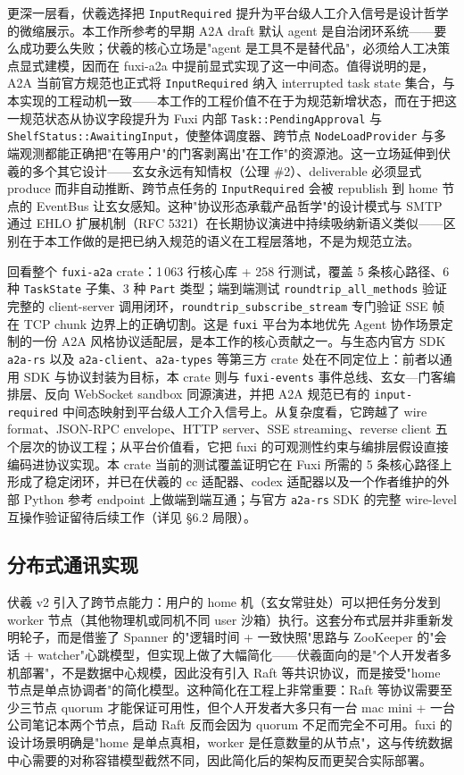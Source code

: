更深一层看，伏羲选择把 \texttt{InputRequired} 提升为平台级人工介入信号是设计哲学的微缩展示。本工作所参考的早期 A2A draft 默认 agent 是自治闭环系统——要么成功要么失败；伏羲的核心立场是"agent 是工具不是替代品"，必须给人工决策点显式建模，因而在 fuxi-a2a 中提前显式实现了这一中间态。值得说明的是，A2A 当前官方规范也正式将 \texttt{InputRequired} 纳入 interrupted task state 集合，与本实现的工程动机一致——本工作的工程价值不在于为规范新增状态，而在于把这一规范状态从协议字段提升为 Fuxi 内部 \texttt{Task::PendingApproval} 与 \texttt{ShelfStatus::AwaitingInput}，使整体调度器、跨节点 \texttt{NodeLoadProvider} 与多端观测都能正确把"在等用户"的门客剥离出"在工作"的资源池。这一立场延伸到伏羲的多个其它设计——玄女永远有知情权（公理 \#2）、deliverable 必须显式 produce 而非自动推断、跨节点任务的 \texttt{InputRequired} 会被 republish 到 home 节点的 EventBus 让玄女感知。这种"协议形态承载产品哲学"的设计模式与 SMTP 通过 EHLO 扩展机制（RFC 5321）在长期协议演进中持续吸纳新语义类似——区别在于本工作做的是把已纳入规范的语义在工程层落地，不是为规范立法。

回看整个 \texttt{fuxi-a2a} crate：1\,063 行核心库 + 258 行测试，覆盖 5 条核心路径、6 种 \texttt{TaskState} 子集、3 种 \texttt{Part} 类型；端到端测试 \texttt{roundtrip\_all\_methods} 验证完整的 client-server 调用闭环，\texttt{roundtrip\_subscribe\_stream} 专门验证 SSE 帧在 TCP chunk 边界上的正确切割。这是 \texttt{fuxi} 平台为本地优先 Agent 协作场景定制的一份 A2A 风格协议适配层，是本工作的核心贡献之一。与生态内官方 SDK \texttt{a2a-rs} 以及 \texttt{a2a-client}、\texttt{a2a-types} 等第三方 crate 处在不同定位上：前者以通用 SDK 与协议封装为目标，本 crate 则与 \texttt{fuxi-events} 事件总线、玄女—门客编排层、反向 WebSocket sandbox 同源演进，并把 A2A 规范已有的 \texttt{input-required} 中间态映射到平台级人工介入信号上。从复杂度看，它跨越了 wire format、JSON-RPC envelope、HTTP server、SSE streaming、reverse client 五个层次的协议工程；从平台价值看，它把 fuxi 的可观测性约束与编排层假设直接编码进协议实现。本 crate 当前的测试覆盖证明它在 Fuxi 所需的 5 条核心路径上形成了稳定闭环，并已在伏羲的 cc 适配器、codex 适配器以及一个作者维护的外部 Python 参考 endpoint 上做端到端互通；与官方 \texttt{a2a-rs} SDK 的完整 wire-level 互操作验证留待后续工作（详见 §6.2 局限）。

\subsection{分布式通讯实现}

伏羲 v2 引入了跨节点能力：用户的 home 机（玄女常驻处）可以把任务分发到 worker 节点（其他物理机或同机不同 user 沙箱）执行。这套分布式层并非重新发明轮子，而是借鉴了 Spanner 的"逻辑时间 + 一致快照"思路\cite{corbett2012spanner}与 ZooKeeper 的"会话 + watcher"心跳模型\cite{hunt2010zookeeper}，但实现上做了大幅简化——伏羲面向的是"个人开发者多机部署"，不是数据中心规模，因此没有引入 Raft\cite{ongaro2014raft} 等共识协议，而是接受"home 节点是单点协调者"的简化模型。这种简化在工程上非常重要：Raft 等协议需要至少三节点 quorum 才能保证可用性，但个人开发者大多只有一台 mac mini + 一台公司笔记本两个节点，启动 Raft 反而会因为 quorum 不足而完全不可用。fuxi 的设计场景明确是"home 是单点真相，worker 是任意数量的从节点"，这与传统数据中心需要的对称容错模型截然不同，因此简化后的架构反而更契合实际部署。

